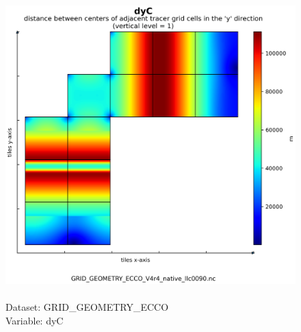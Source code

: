 \begin{figure}[H]
\centering
\includegraphics[scale=0.5]{../images/plots/native_plots_coords/Geometry_Parameters_for_the_Lat-Lon-Cap_90_(llc90)_Native_Model_Grid_(Version_4_Release_4)/dyC.png}
\caption{\\Dataset: GRID\_GEOMETRY\_ECCO\\Variable: dyC}
\label{tab:table-GRID_GEOMETRY_ECCO_dyC-Plot}
\end{figure}
\pagebreak

